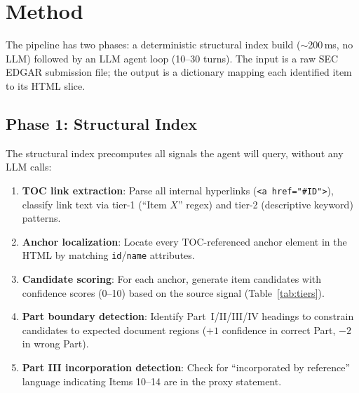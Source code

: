 \documentclass[11pt,a4paper]{article}
\begin{document}
\section{Method}\label{sec:method}

The pipeline has two phases: a deterministic structural index build ($\sim$200\,ms, no LLM) followed by an LLM agent loop (10--30 turns). The input is a raw SEC EDGAR submission file; the output is a dictionary mapping each identified item to its HTML slice.

\subsection{Phase 1: Structural Index}

The structural index precomputes all signals the agent will query, without any LLM calls:

\begin{enumerate}[nosep]
    \item \textbf{TOC link extraction}: Parse all internal hyperlinks (\texttt{<a href="\#ID">}), classify link text via tier-1 (``Item $X$'' regex) and tier-2 (descriptive keyword) patterns.
    \item \textbf{Anchor localization}: Locate every TOC-referenced anchor element in the HTML by matching \texttt{id}/\texttt{name} attributes.
    \item \textbf{Candidate scoring}: For each anchor, generate item candidates with confidence scores (0--10) based on the source signal (Table~\ref{tab:tiers}).
    \item \textbf{Part boundary detection}: Identify Part~I/II/III/IV headings to constrain candidates to expected document regions ($+1$ confidence in correct Part, $-2$ in wrong Part).
    \item \textbf{Part III incorporation detection}: Check for ``incorporated by reference'' language indicating Items 10--14 are in the proxy statement.
\end{enumerate}
\end{document}
